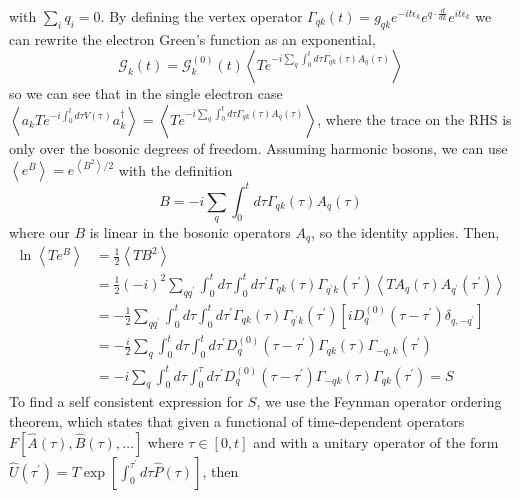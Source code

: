  with $\sum_i q_i=0$. By defining the vertex operator $\Gamma_{q k}(t)=g_{q k} e^{-i t \epsilon_k} e^{q \cdot \frac{d}{d k}} e^{i t \epsilon_k}$ we can rewrite the electron Green's function as an exponential,
\begin{equation}
\mathcal{G}_k(t)=\mathcal{G}_k^{(0)}(t)\left\langle T e^{-i \sum_q \int_0^t d \tau \Gamma_{q k}(\tau) A_q(\tau)}\right\rangle
\end{equation}
so we can see that in the single electron case $\left\langle a_k T e^{-i \int_0^t d \tau V(\mathrm{\tau})} a_k^\dag\right\rangle = \left\langle T e^{-i \sum_q \int_0^t d \tau \Gamma_{q k}(\tau) A_q(\tau)}\right\rangle$, where the trace on the RHS is only over the bosonic degrees of freedom. Assuming harmonic bosons, we can use $\left\langle e^B \right\rangle = e^{\left\langle B^2\right\rangle / 2}$ with the definition
\begin{equation}
    B=-i \sum_q \int_0^t d \tau \Gamma_{q k}(\tau) A_q(\tau)
\end{equation}
where our $B$ is linear in the bosonic operators $A_q$, so the identity applies. Then, 
\begin{align}
    \ln \left\langle T e^B\right\rangle & =\frac{1}{2}\left\langle T B^2\right\rangle \\
& =\frac{1}{2}(-i)^2 \sum_{q q^{\prime}} \int_0^t d \tau \int_0^t d \tau^{\prime} \Gamma_{q k}(\tau) \Gamma_{q^{\prime} k}\left(\tau^{\prime}\right)\left\langle T A_q(\tau) A_{q^{\prime}}\left(\tau^{\prime}\right)\right\rangle \\
& =-\frac{1}{2} \sum_{q q^{\prime}} \int_0^t d \tau \int_0^t d \tau^{\prime} \Gamma_{q k}(\tau) \Gamma_{q^{\prime} k}\left(\tau^{\prime}\right)\left[i D_q^{(0)}\left(\tau-\tau^{\prime}\right) \delta_{q,-q^{\prime}}\right] \\
& =-\frac{i}{2} \sum_q \int_0^t d \tau \int_0^t d \tau^{\prime} D_q^{(0)}\left(\tau-\tau^{\prime}\right) \Gamma_{q k}(\tau) \Gamma_{-q, k}\left(\tau^{\prime}\right) \\
& = -i \sum_q \int_0^t d \tau \int_0^\tau d \tau^{\prime} D_q^{(0)}\left(\tau-\tau^{\prime}\right) \Gamma_{-q k}(\tau) \Gamma_{q k}\left(\tau^{\prime}\right) = S
\end{align}
To find a self consistent expression for $S$, we use the Feynman operator ordering theorem, which states that given a functional of time-dependent operators $F[\hat{A}(\tau), \hat{B}(\tau), \ldots]$ where $\tau \in[0, t]$ and with a unitary operator of the form $\hat{U}\left(\tau^{\prime}\right)=T \exp \left[\int_0^{\tau^{\prime}} d \tau \hat{P}(\tau)\right]$, then
